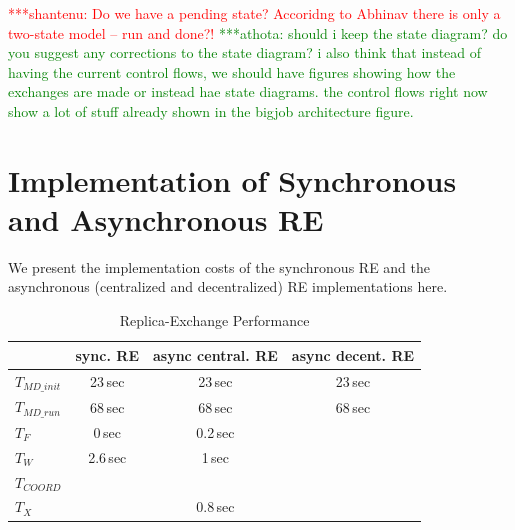 \documentclass{rspublic}
\newcommand{\jhanote}[1]{ {\textcolor{red} { ***shantenu: #1 }}}
\newcommand{\alnote}[1]{ {\textcolor{blue} { ***andre: #1 }}}
\newcommand{\athotanote}[1]{ {\textcolor{green} { ***athota: #1 }}}
\newcommand{\alnote}[1]{}
\newcommand{\athotanote}[1]{}
\newcommand{\jhanote}[1]{}
\begin{document}
\jhanote{Do we have a pending state? Accoridng to Abhinav there is
  only a two-state model -- run and done?!} \athotanote{should i keep the state diagram? do you suggest any corrections to the state diagram? i also think that instead of having the current control flows, we should have figures showing how the exchanges are made or instead hae state diagrams. the control flows right now show a lot of stuff already shown in the bigjob architecture figure. }
  

\section{Implementation of Synchronous and Asynchronous RE}



We present the implementation costs of the synchronous RE and the
asynchronous (centralized and decentralized) RE implementations here.


\begin{table}
    \centering
	\begin{tabular}{|l|c|c|c|}
	\hline
	                        &sync. RE &async central. RE &async decent. RE\\
	\hline
	$T_{MD\_init}$  &23\,sec &23\,sec &23\,sec\\
	\hline
	$T_{MD\_run}$   &68\,sec &68\,sec &68\,sec\\
	\hline
	$T_{F}$           &0\,sec   &0.2\,sec &\\
	\hline
	$T_{W}$           &2.6\,sec &1\,sec &\\
	\hline
	$T_{COORD}$       &&&\\
	\hline
	$T_{X}$          &&0.8\,sec &\\
	\hline
	\end{tabular}
	\caption{Replica-Exchange Performance}
	\label{table:repex_perf}
\end{table}
\end{document}
